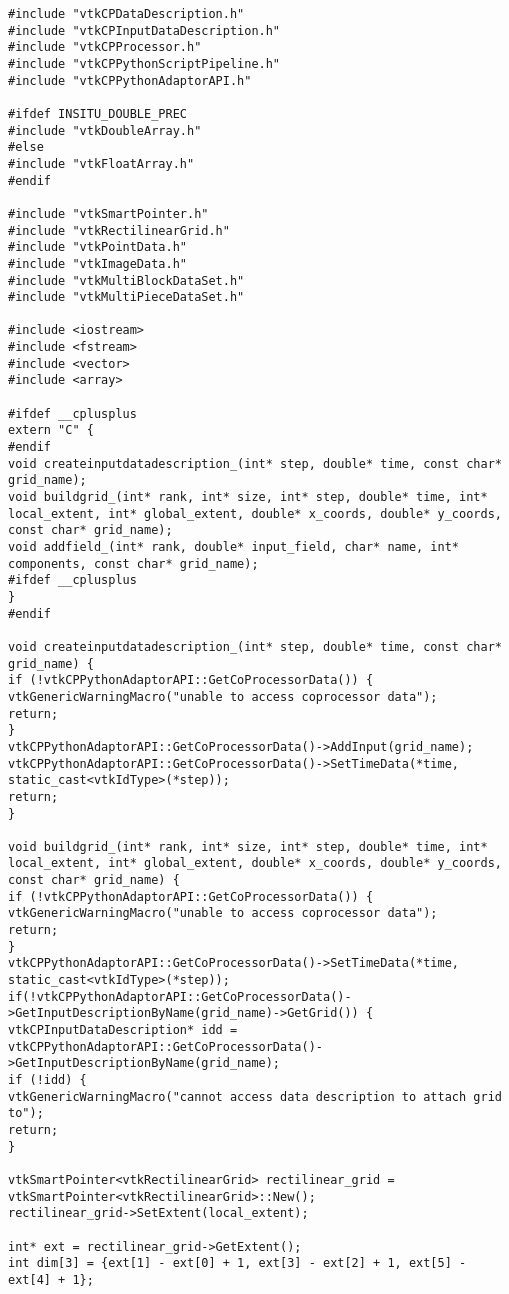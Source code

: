 \begin{lstlisting}[style=CXX, caption=C++ adaptor for ParaView Catalyst]
#include "vtkCPDataDescription.h"
#include "vtkCPInputDataDescription.h"
#include "vtkCPProcessor.h"
#include "vtkCPPythonScriptPipeline.h"
#include "vtkCPPythonAdaptorAPI.h"

#ifdef INSITU_DOUBLE_PREC
#include "vtkDoubleArray.h"
#else
#include "vtkFloatArray.h"
#endif

#include "vtkSmartPointer.h"
#include "vtkRectilinearGrid.h"
#include "vtkPointData.h"
#include "vtkImageData.h"
#include "vtkMultiBlockDataSet.h"
#include "vtkMultiPieceDataSet.h"

#include <iostream>
#include <fstream>
#include <vector>
#include <array>

#ifdef __cplusplus
extern "C" {
#endif
void createinputdatadescription_(int* step, double* time, const char* grid_name);
void buildgrid_(int* rank, int* size, int* step, double* time, int* local_extent, int* global_extent, double* x_coords, double* y_coords, const char* grid_name);
void addfield_(int* rank, double* input_field, char* name, int* components, const char* grid_name);
#ifdef __cplusplus
}
#endif

void createinputdatadescription_(int* step, double* time, const char* grid_name) {
if (!vtkCPPythonAdaptorAPI::GetCoProcessorData()) {
vtkGenericWarningMacro("unable to access coprocessor data");
return;
}
vtkCPPythonAdaptorAPI::GetCoProcessorData()->AddInput(grid_name);
vtkCPPythonAdaptorAPI::GetCoProcessorData()->SetTimeData(*time, static_cast<vtkIdType>(*step));
return;
}

void buildgrid_(int* rank, int* size, int* step, double* time, int* local_extent, int* global_extent, double* x_coords, double* y_coords, const char* grid_name) {
if (!vtkCPPythonAdaptorAPI::GetCoProcessorData()) {
vtkGenericWarningMacro("unable to access coprocessor data");
return;
}
vtkCPPythonAdaptorAPI::GetCoProcessorData()->SetTimeData(*time, static_cast<vtkIdType>(*step));
if(!vtkCPPythonAdaptorAPI::GetCoProcessorData()->GetInputDescriptionByName(grid_name)->GetGrid()) {
vtkCPInputDataDescription* idd = vtkCPPythonAdaptorAPI::GetCoProcessorData()->GetInputDescriptionByName(grid_name);
if (!idd) {
vtkGenericWarningMacro("cannot access data description to attach grid to");
return;
}

vtkSmartPointer<vtkRectilinearGrid> rectilinear_grid =
vtkSmartPointer<vtkRectilinearGrid>::New();
rectilinear_grid->SetExtent(local_extent);

int* ext = rectilinear_grid->GetExtent();
int dim[3] = {ext[1] - ext[0] + 1, ext[3] - ext[2] + 1, ext[5] - ext[4] + 1};


\end{lstlisting}
